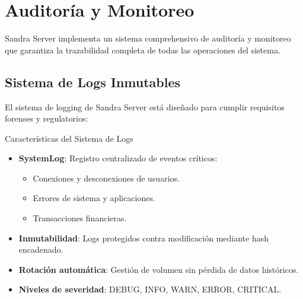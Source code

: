 %
%

\newpage

\section{Auditoría y Monitoreo}

Sandra Server implementa un sistema comprehensivo de auditoría y monitoreo que garantiza la trazabilidad completa de todas las operaciones del sistema.

\subsection{Sistema de Logs Inmutables}

El sistema de logging de Sandra Server está diseñado para cumplir requisitos forenses y regulatorios:

\begin{caja}{Características del Sistema de Logs}
\begin{itemize}
\item \textbf{SystemLog}: Registro centralizado de eventos críticos:
  \begin{itemize}
  \item Conexiones y desconexiones de usuarios.
  \item Errores de sistema y aplicaciones.
  \item Transacciones financieras.
  \end{itemize}
\item \textbf{Inmutabilidad}: Logs protegidos contra modificación mediante hash encadenado.
\item \textbf{Rotación automática}: Gestión de volumen sin pérdida de datos históricos.
\item \textbf{Niveles de severidad}: DEBUG, INFO, WARN, ERROR, CRITICAL.
\end{itemize}
\end{caja}

